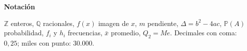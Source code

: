 \documentclass[11pt,letterpaper,openany]{book}
\begin{document}
\medskip
{\large\bfseries\color{nar} Notación}\par\smallskip
$\mathbb{Z}$ enteros, $\mathbb{Q}$ racionales, $f(x)$ imagen de $x$, $m$ pendiente, $\Delta = b^2 - 4ac$, $\mathbb{P}(A)$ probabilidad, $f_i$ y $h_i$ frecuencias, $\bar{x}$ promedio, $Q_2 = Me$. Decimales con coma: $0{,}25$; miles con punto: $30.000$.

\tableofcontents

\ifdefined\solocap  \else





\fi

\end{document}
